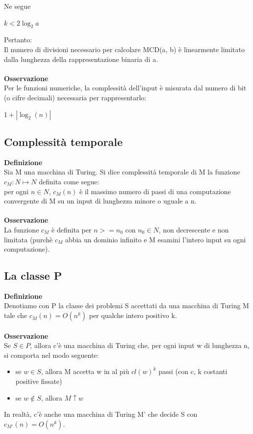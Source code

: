 Ne segue\\
\begin{center}
    $k < 2\log_2 a$
\end{center}
Pertanto:\\
Il numero di divisioni necessario per calcolare MCD(a, b) è linearmente limitato dalla lunghezza della rappresentazione binaria di a.\\\\
\textbf{Osservazione}\\
Per le funzioni numeriche, la complessità dell’input è misurata dal numero di bit (o cifre decimali) necessaria per rappresentarlo:
\begin{center}
    $1 + |\log_2(n)|$
\end{center}
\newpage
\subsection{Complessità temporale}
\textbf{Definizione}\\
Sia M una macchina di Turing. Si dice complessità temporale di M la funzione $c_M : N \mapsto N$ definita come segue:\\
per ogni $n \in N$, $c_M (n)$ è il massimo numero di passi di una computazione convergente di M su un input di lunghezza minore o uguale a n.\\\\
\textbf{Osservazione}\\
La funzione $c_M$ è definita per $n >= n_0$ con $n_0 \in N$, non decrescente e non limitata (purchè $c_M$ abbia un dominio infinito e M esamini l’intero input su ogni computazione).
\subsection{La classe P}
\textbf{Definizione}\\
Denotiamo con P la classe dei problemi S accettati da una macchina di Turing M tale che $c_M (n) = O(n^k)$ per qualche intero positivo k.\\\\
\textbf{Osservazione}\\
Se $S \in P$, allora c’è una macchina di Turing che, per ogni input w di lunghezza n, si comporta nel modo seguente:
\begin{itemize}
    \item se $w \in S$, allora M accetta w in al più $cl(w)^k$ passi (con c, k costanti positive fissate)
    
    \item se $w \notin S$, allora $M \uparrow w$
\end{itemize}
In realtà, c’è anche una macchina di Turing M'
che decide S con $c_{M'}(n) = O(n^k)$.
\newpage
